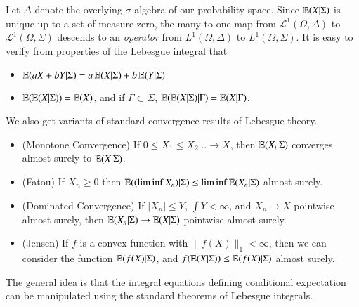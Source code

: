 Let $\Delta$ denote the overlying $\sigma$ algebra of our probability space. Since $\operatorname{\mathbb{E}}(X|\Sigma)$ is unique up to a set of measure zero, the many to one map from $\mathcal{L}^1(\Omega, \Delta)$ to $\mathcal{L}^1(\Omega, \Sigma)$ descends to an {\it operator} from $L^1(\Omega, \Delta)$ to $L^1(\Omega, \Sigma)$. It is easy to verify from properties of the Lebesgue integral that
%
\begin{itemize}
    \item $\operatorname{\mathbb{E}}(aX + bY|\Sigma) = a \operatorname{\mathbb{E}}(X|\Sigma) + b \operatorname{\mathbb{E}}(Y|\Sigma)$
    \item $\operatorname{\mathbb{E}}(\operatorname{\mathbb{E}}(X|\Sigma)) = \operatorname{\mathbb{E}}(X)$, and if $\Gamma \subset \Sigma$, $\operatorname{\mathbb{E}}(\operatorname{\mathbb{E}}(X|\Sigma)|\Gamma) = \operatorname{\mathbb{E}}(X|\Gamma)$.
\end{itemize}
%
We also get variants of standard convergence results of Lebesgue theory.
%
\begin{itemize}
    \item (Monotone Convergence) If $0 \leq X_1 \leq X_2 \dots \to X$, then $\operatorname{\mathbb{E}}(X_i|\Sigma)$ converges almost surely to $\operatorname{\mathbb{E}}(X|\Sigma)$.
    \item (Fatou) If $X_n \geq 0$ then $\operatorname{\mathbb{E}}((\liminf X_n)|\Sigma) \leq \liminf \operatorname{\mathbb{E}}(X_n|\Sigma)$ almost surely.
    \item (Dominated Convergence) If $|X_n| \leq Y$, $\int Y < \infty$, and $X_n \to X$ pointwise almost surely, then $\operatorname{\mathbb{E}}(X_n|\Sigma) \to \operatorname{\mathbb{E}}(X|\Sigma)$ pointwise almost surely.
    \item (Jensen) If $f$ is a convex function with $\| f(X) \|_1 < \infty$, then we can consider the function $\operatorname{\mathbb{E}}(f(X)|\Sigma)$, and $f(\operatorname{\mathbb{E}}(X|\Sigma)) \leq \operatorname{\mathbb{E}}(f(X)|\Sigma)$ almost surely.
\end{itemize}
%
The general idea is that the integral equations defining conditional expectation can be manipulated using the standard theorems of Lebesgue integrals.

